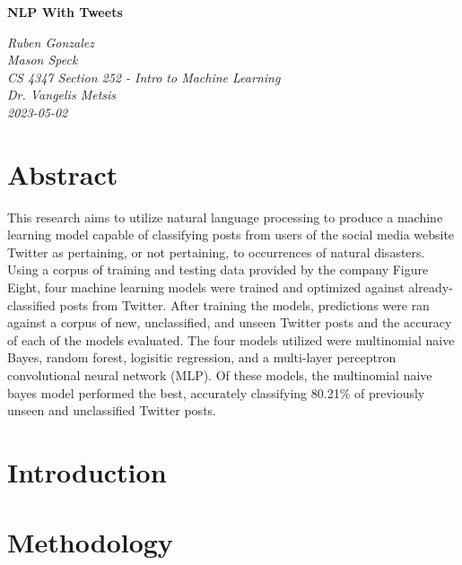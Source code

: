 \documentclass[11pt]{article}
\def\Title#1{\begin{center} {\Large {\bf #1} } \end{center}}
\begin{document}
\Title{NLP With Tweets}

\bigskip\bigskip

\begin{raggedright}

{\it
Ruben Gonzalez\\
Mason Speck\\
CS 4347 Section 252 - Intro to Machine Learning\\
Dr. Vangelis Metsis\\
2023-05-02
}
\bigskip\bigskip
\end{raggedright}


\section{Abstract}


This research aims to utilize natural language processing to produce a machine learning model capable of classifying posts from users of the social media website Twitter as pertaining, or not pertaining, to occurrences of natural disasters. Using a corpus of training and testing data provided by the company Figure Eight, four machine learning models were trained and optimized against already-classified posts from Twitter. After training the models, predictions were ran against a corpus of new, unclassified, and unseen Twitter posts and the accuracy of each of the models evaluated. The four models utilized were multinomial naive Bayes, random forest, logisitic regression, and a multi-layer perceptron convolutional neural network (MLP). Of these models, the multinomial naive bayes model performed the best, accurately classifying 80.21\% of previously unseen and unclassified Twitter posts.

\section{Introduction}


\section{Methodology}
\end{document}
